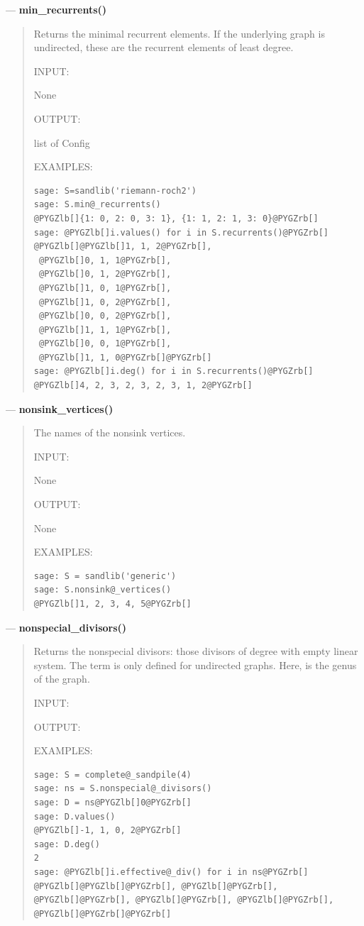 \documentclass[letterpaper,10pt,english]{manual}
\begin{document}
---
\hypertarget{min-recurrents}{}
\textbf{min\_recurrents()}
\begin{quote}

Returns the minimal recurrent elements.  If the underlying graph is
undirected, these are the recurrent elements of least degree.

INPUT:

None

OUTPUT:

list of Config

EXAMPLES:

\begin{Verbatim}[commandchars=@\[\]]
sage: S=sandlib('riemann-roch2')
sage: S.min@_recurrents()
@PYGZlb[]{1: 0, 2: 0, 3: 1}, {1: 1, 2: 1, 3: 0}@PYGZrb[]
sage: @PYGZlb[]i.values() for i in S.recurrents()@PYGZrb[]
@PYGZlb[]@PYGZlb[]1, 1, 2@PYGZrb[],
 @PYGZlb[]0, 1, 1@PYGZrb[],
 @PYGZlb[]0, 1, 2@PYGZrb[],
 @PYGZlb[]1, 0, 1@PYGZrb[],
 @PYGZlb[]1, 0, 2@PYGZrb[],
 @PYGZlb[]0, 0, 2@PYGZrb[],
 @PYGZlb[]1, 1, 1@PYGZrb[],
 @PYGZlb[]0, 0, 1@PYGZrb[],
 @PYGZlb[]1, 1, 0@PYGZrb[]@PYGZrb[]
sage: @PYGZlb[]i.deg() for i in S.recurrents()@PYGZrb[]
@PYGZlb[]4, 2, 3, 2, 3, 2, 3, 1, 2@PYGZrb[]
\end{Verbatim}
\end{quote}

---
\hypertarget{nonsink-vertices}{}
\textbf{nonsink\_vertices()}
\begin{quote}

The names of the nonsink vertices.

INPUT:

None

OUTPUT:

None

EXAMPLES:

\begin{Verbatim}[commandchars=@\[\]]
sage: S = sandlib('generic')
sage: S.nonsink@_vertices()
@PYGZlb[]1, 2, 3, 4, 5@PYGZrb[]
\end{Verbatim}
\end{quote}

---
\hypertarget{nonspecial-divisors}{}
\textbf{nonspecial\_divisors()}
\begin{quote}

Returns the nonspecial divisors: those divisors of degree  with
empty linear system.  The term is only defined for undirected graphs.
Here,  is the genus of the graph.

INPUT:

OUTPUT:

EXAMPLES:

\begin{Verbatim}[commandchars=@\[\]]
sage: S = complete@_sandpile(4)
sage: ns = S.nonspecial@_divisors()
sage: D = ns@PYGZlb[]0@PYGZrb[]
sage: D.values()
@PYGZlb[]-1, 1, 0, 2@PYGZrb[]
sage: D.deg()
2
sage: @PYGZlb[]i.effective@_div() for i in ns@PYGZrb[]
@PYGZlb[]@PYGZlb[]@PYGZrb[], @PYGZlb[]@PYGZrb[], @PYGZlb[]@PYGZrb[], @PYGZlb[]@PYGZrb[], @PYGZlb[]@PYGZrb[], @PYGZlb[]@PYGZrb[]@PYGZrb[]
\end{Verbatim}
\end{quote}
\end{document}
